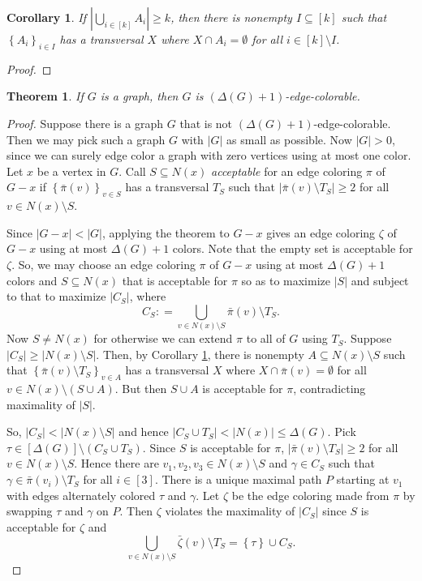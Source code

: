 \documentclass{amsbook}
\theoremstyle{plain}
\newtheorem{corollary}{Corollary}
\newtheorem{theorem}{Theorem}
\numberwithin{equation}{chapter}
\newcommand{\set}[1]{\left\{ #1 \right\}}
\newcommand{\card}[1]{\left|#1\right|}
\newcommand{\irange}[1]{\left[#1\right]}
\newcommand{\parens}[1]{\left( #1 \right)}
\newcommand{\DefinedAs}{\mathrel{\mathop:}=}
\begin{document}
\begin{corollary}\label{TransversalCorollary}
If $\card{\bigcup_{i \in \irange{k}} A_i} \ge k$, then there is nonempty $I \subseteq \irange{k}$ such that $\set{A_i}_{i \in I}$ has a transversal $X$ where $X \cap A_i = \emptyset$
for all $i \in \irange{k} \setminus I$.
\end{corollary}
\begin{proof}
\end{proof}

\begin{theorem}
If $G$ is a graph, then $G$ is $\parens{\Delta(G) + 1}$-edge-colorable.
\end{theorem}
\begin{proof}
Suppose there is a graph $G$ that is not $(\Delta(G) + 1)$-edge-colorable.  Then we may pick such a graph $G$ with $\card{G}$ as small as possible.
Now $\card{G} > 0$, since we can surely edge color a graph with zero vertices using at most one color. Let $x$ be a vertex in $G$.   Call $S\subseteq N(x)$ \emph{acceptable} for 
an edge coloring $\pi$ of $G-x$ if $\set{\bar{\pi}(v)}_{v \in S}$ has a transversal $T_S$ such that $\card{\bar{\pi}(v) \setminus T_S} \ge 2$ for all $v \in N(x)\setminus S$.

Since $\card{G-x} < \card{G}$, applying the theorem to $G-x$ gives an edge coloring $\zeta$ of $G-x$ using at most $\Delta(G) + 1$ colors. 
Note that the empty set is acceptable for $\zeta$.  So, we may choose an edge coloring $\pi$ of $G-x$ using at most $\Delta(G) + 1$ colors and $S\subseteq N(x)$ 
that is acceptable for $\pi$ so as to maximize $\card{S}$ and subject to that to maximize $\card{C_S}$, where
\[C_S \DefinedAs \bigcup_{v \in N(x) \setminus S} \bar{\pi}(v) \setminus T_S.\]
Now $S \neq N(x)$ for otherwise we can extend $\pi$ to all of $G$ using $T_S$.  Suppose $\card{C_S}\ge \card{N(x) \setminus S}$.
Then, by Corollary \ref{TransversalCorollary}, there is nonempty $A \subseteq N(x) \setminus S$ such that $\set{\bar{\pi}(v)\setminus T_S}_{v \in A}$ has
a transversal $X$ where $X \cap \bar{\pi}(v) = \emptyset$ for all $v \in N(x) \setminus \parens{S \cup A}$.  But then $S\cup A$ is acceptable for $\pi$, contradicting
maximality of $\card{S}$.  

So, $\card{C_S}< \card{N(x) \setminus S}$ and hence $\card{C_S \cup T_S} < \card{N(x)} \le \Delta(G)$.  
Pick $\tau \in \irange{\Delta(G)} \setminus \parens{C_S \cup T_S}$.  Since $S$ is acceptable for $\pi$, $\card{\bar{\pi}(v) \setminus T_S} \ge 2$ for all $v \in N(x)\setminus S$.
Hence there are $v_1, v_2, v_3 \in N(x)\setminus S$ and $\gamma \in C_S$ such that $\gamma \in \bar{\pi}(v_i) \setminus T_S$ for all $i \in \irange{3}$.
There is a unique maximal path $P$ starting at $v_1$ with edges alternately colored $\tau$ and $\gamma$.  
Let $\zeta$ be the edge coloring made from $\pi$ by swapping $\tau$ and $\gamma$ on $P$.  Then $\zeta$ violates the maximality of $\card{C_S}$ since $S$ is acceptable for $\zeta$ and
\[\bigcup_{v \in N(x) \setminus S} \bar{\zeta}(v) \setminus T_S = \set{\tau} \cup C_S.\]

\end{proof}
\end{document}
